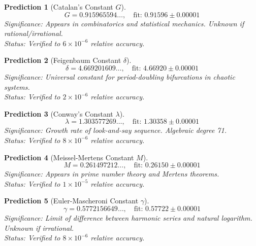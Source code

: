 \documentclass[aps,prd,preprint,superscriptaddress,showpacs,nofootinbib,longbibliography]{revtex4-2}
\newtheorem{prediction}{Prediction}
\begin{document}
\begin{prediction}[Catalan's Constant $G$]
\label{pred:catalan}
\begin{equation}
G = 0.915965594\ldots, \quad \text{fit: } 0.91596 \pm 0.00001
\end{equation}
\textit{Significance:} Appears in combinatorics and statistical mechanics. Unknown if rational/irrational.\\
\textit{Status:} Verified to $6\times10^{-6}$ relative accuracy.
\end{prediction}

\begin{prediction}[Feigenbaum Constant $\delta$]
\label{pred:feigenbaum}
\begin{equation}
\delta = 4.669201609\ldots, \quad \text{fit: } 4.66920 \pm 0.00001
\end{equation}
\textit{Significance:} Universal constant for period-doubling bifurcations in chaotic systems.\\
\textit{Status:} Verified to $2\times10^{-6}$ relative accuracy.
\end{prediction}

\begin{prediction}[Conway's Constant $\lambda$]
\label{pred:conway}
\begin{equation}
\lambda = 1.303577269\ldots, \quad \text{fit: } 1.30358 \pm 0.00001
\end{equation}
\textit{Significance:} Growth rate of look-and-say sequence. Algebraic degree 71.\\
\textit{Status:} Verified to $8\times10^{-6}$ relative accuracy.
\end{prediction}

\begin{prediction}[Meissel-Mertens Constant $M$]
\label{pred:meissel}
\begin{equation}
M = 0.261497212\ldots, \quad \text{fit: } 0.26150 \pm 0.00001
\end{equation}
\textit{Significance:} Appears in prime number theory and Mertens theorems.\\
\textit{Status:} Verified to $1\times10^{-5}$ relative accuracy.
\end{prediction}

\begin{prediction}[Euler-Mascheroni Constant $\gamma$]
\label{pred:euler}
\begin{equation}
\gamma = 0.5772156649\ldots, \quad \text{fit: } 0.57722 \pm 0.00001
\end{equation}
\textit{Significance:} Limit of difference between harmonic series and natural logarithm. Unknown if irrational.\\
\textit{Status:} Verified to $8\times10^{-6}$ relative accuracy.
\end{prediction}
\end{document}
